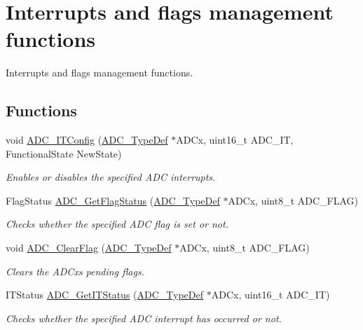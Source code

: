\hypertarget{group___a_d_c___group7}{}\section{Interrupts and flags management functions}
\label{group___a_d_c___group7}


Interrupts and flags management functions.  


\subsection*{Functions}
\begin{DoxyCompactItemize}
\item 
void \hyperlink{group___a_d_c___group7_gad4c84b54b539944f555488bf979f82b6}{A\+D\+C\+\_\+\+I\+T\+Config} (\hyperlink{struct_a_d_c___type_def}{A\+D\+C\+\_\+\+Type\+Def} $\ast$A\+D\+Cx, uint16\+\_\+t A\+D\+C\+\_\+\+IT, Functional\+State New\+State)
\begin{DoxyCompactList}\small\item\em Enables or disables the specified A\+DC interrupts. \end{DoxyCompactList}\item 
Flag\+Status \hyperlink{group___a_d_c___group7_gaa12546e51ec905c90a3aada432bd4633}{A\+D\+C\+\_\+\+Get\+Flag\+Status} (\hyperlink{struct_a_d_c___type_def}{A\+D\+C\+\_\+\+Type\+Def} $\ast$A\+D\+Cx, uint8\+\_\+t A\+D\+C\+\_\+\+F\+L\+AG)
\begin{DoxyCompactList}\small\item\em Checks whether the specified A\+DC flag is set or not. \end{DoxyCompactList}\item 
void \hyperlink{group___a_d_c___group7_gaf34f36798f811b4a41321ea2d12118d4}{A\+D\+C\+\_\+\+Clear\+Flag} (\hyperlink{struct_a_d_c___type_def}{A\+D\+C\+\_\+\+Type\+Def} $\ast$A\+D\+Cx, uint8\+\_\+t A\+D\+C\+\_\+\+F\+L\+AG)
\begin{DoxyCompactList}\small\item\em Clears the A\+D\+Cx\textquotesingle{}s pending flags. \end{DoxyCompactList}\item 
I\+T\+Status \hyperlink{group___a_d_c___group7_gaa1d3b910a83dbf14d4f68c8eef058612}{A\+D\+C\+\_\+\+Get\+I\+T\+Status} (\hyperlink{struct_a_d_c___type_def}{A\+D\+C\+\_\+\+Type\+Def} $\ast$A\+D\+Cx, uint16\+\_\+t A\+D\+C\+\_\+\+IT)
\begin{DoxyCompactList}\small\item\em Checks whether the specified A\+DC interrupt has occurred or not. \end{DoxyCompactList}\item 

\end{DoxyCompactItemize}
